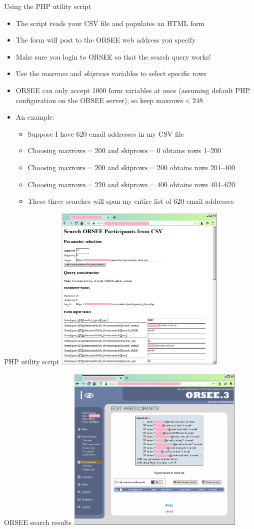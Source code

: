 \documentclass[professionalfont,10pt]{beamer}
\begin{document}
\begin{frame}{Using the PHP utility script}
\begin{itemize}
\item The script reads your CSV file and populates an HTML form
\item The form will post to the ORSEE web address you specify
\item Make sure you login to ORSEE so that the search query works!
\vspace{0.25cm}
\item Use the \emph{maxrows} and \emph{skiprows} variables to select specific rows
\item ORSEE can only accept 1000 form variables at once (assuming default PHP configuration on the ORSEE server), so keep $\text{maxrows}<248$
\vspace{0.25cm}
\item An example:
\begin{itemize}
\item Suppose I have 620 email addresses in my CSV file
\item Choosing $\text{maxrows}=200$ and $\text{skiprows}=0$ obtains rows 1--200
\item Choosing $\text{maxrows}=200$ and $\text{skiprows}=200$ obtains rows 201--400
\item Choosing $\text{maxrows}=220$ and $\text{skiprows}=400$ obtains rows 401--620
\item These three searches will span my entire list of 620 email addresses
\end{itemize}
\end{itemize}
\end{frame}

\begin{frame}{PHP utility script}
\includegraphics[height=8cm]{web-utility-script.png}
\end{frame}

\begin{frame}{ORSEE search results}
\includegraphics[height=8cm]{orsee-search.png}
\end{frame}
\end{document}

